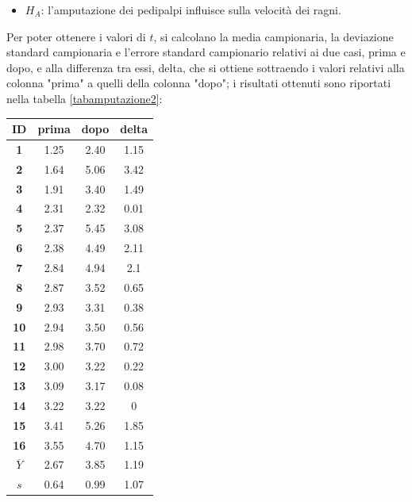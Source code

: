\documentclass[10pt, draft]{book}
\newcounter{example}[section]
\begin{document}
\begin{example}
\begin{itemize}
        \item $H_A$: l'amputazione dei pedipalpi influisce sulla velocità dei ragni.
    \end{itemize}
    Per poter ottenere i valori di $t$, si calcolano la media campionaria, la deviazione standard campionaria e l'errore standard campionario relativi ai due casi, prima e dopo, e alla differenza tra essi, delta, che si ottiene sottraendo i valori relativi alla colonna "prima" a quelli della colonna "dopo"; i risultati ottenuti sono riportati nella tabella \ref{tabamputazione2}:
    \begin{table}[H]
        \centering
        \renewcommand\arraystretch{1.2}
        \begin{tabular}{c|c|c||c}
        \hline
        \textbf{ID} & \textbf{prima} & \textbf{dopo} & \textbf{delta}\\ 
        \hline
        \textbf{1} & 1.25 & 2.40 & 1.15\\
        \hline
        \textbf{2} & 1.64 & 5.06 & 3.42\\
        \hline
        \textbf{3} & 1.91 & 3.40 & 1.49\\
        \hline
        \textbf{4} & 2.31 & 2.32 & 0.01\\
        \hline
        \textbf{5} & 2.37 & 5.45 & 3.08\\
        \hline
        \textbf{6} & 2.38 & 4.49 & 2.11\\
        \hline
        \textbf{7} & 2.84 & 4.94 & 2.1\\
        \hline
        \textbf{8} & 2.87 & 3.52 & 0.65\\
        \hline
        \textbf{9} & 2.93 & 3.31 & 0.38\\
        \hline
        \textbf{10} & 2.94 & 3.50 & 0.56\\
        \hline
        \textbf{11} & 2.98 & 3.70 & 0.72\\
        \hline
        \textbf{12} & 3.00 & 3.22 & 0.22\\
        \hline
        \textbf{13} & 3.09 & 3.17 & 0.08\\
        \hline
        \textbf{14} & 3.22 & 3.22 & 0\\
        \hline
        \textbf{15} & 3.41 & 5.26 & 1.85\\
        \hline
        \textbf{16} & 3.55 & 4.70 & 1.15\\
        \hline
        \hline
        \textbf{$\overline{Y}$} & 2.67 & 3.85 & 1.19\\
        \hline
        \textbf{$s$} & 0.64 & 0.99 & 1.07\\

\end{tabular}
\end{table}
\end{example}
\end{document}
